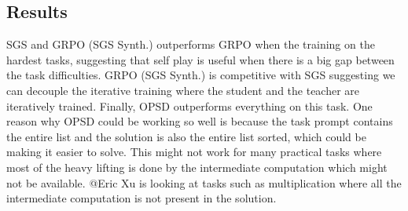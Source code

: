 \subsection{Results}
SGS and GRPO (SGS Synth.) outperforms GRPO when the training on the hardest tasks, suggesting that self play is useful when there is a big gap between the task difficulties. 
GRPO (SGS Synth.) is competitive with SGS suggesting we can decouple the iterative training where the student and the teacher are iteratively trained. 
Finally, OPSD outperforms everything on this task. 
One reason why OPSD could be working so well is because the task prompt contains the entire list and the solution is also the entire list sorted, which could be making it easier to solve. This might not work for many practical tasks where most of the heavy lifting is done by the intermediate computation which might not be available. @Eric Xu is looking at tasks such as multiplication where all the intermediate computation is not present in the solution.